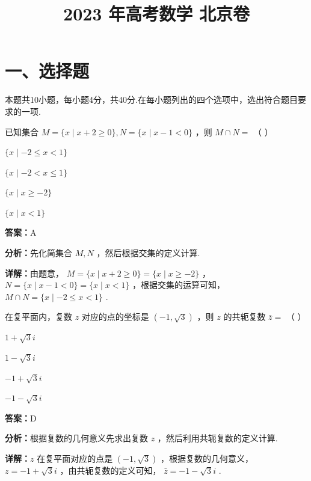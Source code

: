 ﻿\title{2023 年高考数学 北京卷}
\date{}
\maketitle

\section*{一、选择题}
本题共10小题，每小题4分，共40分.在每小题列出的四个选项中，选出符合题目要求的一项.

\begin{question}[points=4]
已知集合 $M = \{x \mid x + 2 \ge 0\}, N = \{x \mid x - 1 < 0\}$ ，则 $M \cap N =$ （ ）
\begin{choices}
  \item $\{x \mid -2 \le x < 1\}$
  \item $\{x \mid -2 < x \le 1\}$
  \item $\{x \mid x \ge -2\}$
  \item $\{x \mid x < 1\}$
\end{choices}
\begin{solution}
\textbf{答案：}A

\textbf{分析：}先化简集合 $M, N$ ，然后根据交集的定义计算.

\textbf{详解：}由题意， $M = \{x \mid x + 2 \ge 0\} = \{x \mid x \ge -2\}$ ， $N = \{x \mid x - 1 < 0\} = \{x \mid x < 1\}$ ，根据交集的运算可知， $M \cap N = \{x \mid -2 \le x < 1\}$ .
\end{solution}
\end{question}

\begin{question}[points=4]
在复平面内，复数 $z$ 对应的点的坐标是 $(-1, \sqrt{3})$ ，则 $z$ 的共轭复数 $\bar{z} =$ （ ）
\begin{choices}
  \item $1 + \sqrt{3}i$
  \item $1 - \sqrt{3}i$
  \item $-1 + \sqrt{3}i$
  \item $-1 - \sqrt{3}i$
\end{choices}
\begin{solution}
\textbf{答案：}D

\textbf{分析：}根据复数的几何意义先求出复数 $z$ ，然后利用共轭复数的定义计算.

\textbf{详解：}$z$ 在复平面对应的点是 $(-1, \sqrt{3})$ ，根据复数的几何意义， $z = -1 + \sqrt{3}i$ ，由共轭复数的定义可知， $\bar{z} = -1 - \sqrt{3}i$ .
\end{solution}
\end{question}

